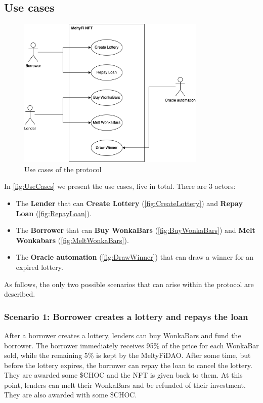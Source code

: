 \subsection{Use cases}
\begin{figure}[h]
    \centering
    \includegraphics[width=0.8\textwidth]{figures/use_cases.png}
    \caption{Use cases of the protocol}
    \label{fig:UseCases}
\end{figure}
In \autoref{fig:UseCases} we present the use cases, five in total. There are 3 actors:
\begin{itemize}
    \item The \textbf{Lender} that can \textbf{Create Lottery} (\autoref{fig:CreateLottery}) and \textbf{Repay Loan} (\autoref{fig:RepayLoan}).
    \item The \textbf{Borrower} that can \textbf{Buy WonkaBars} (\autoref{fig:BuyWonkaBars}) and \textbf{Melt Wonkabars} (\autoref{fig:MeltWonkaBars}). 
    \item The \textbf{Oracle automation} (\autoref{fig:DrawWinner}) that can draw a winner for an expired lottery.
\end{itemize}
As follows, the only two possible scenarios that can arise within the protocol are described.

\subsubsection{Scenario 1: Borrower creates a lottery and repays the loan}
After a borrower creates a lottery, lenders can buy WonkaBars and fund the borrower. The borrower immediately receives 95\% of the price for each WonkaBar sold, while the remaining 5\% is kept by the MeltyFiDAO. After some time, but before the lottery expires, the borrower can repay the loan to cancel the lottery. They are awarded some \$CHOC and the NFT is given back to them. At this point, lenders can melt their WonkaBars and be refunded of their investment. They are also awarded with some \$CHOC.

